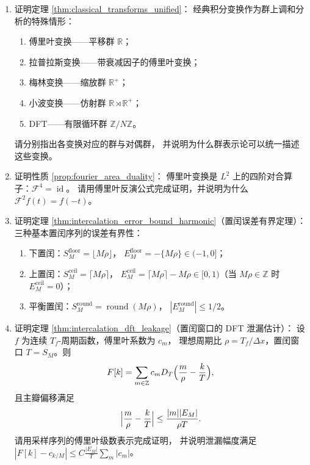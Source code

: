 \begin{enumerate}[leftmargin=3em, label=\textbf{题 \arabic*}]
    \item 证明定理 \ref{thm:classical_transforms_unified}：
    经典积分变换作为群上调和分析的特殊情形：
    \begin{enumerate}[label=(\roman*)]
        \item 傅里叶变换——平移群 $\mathbb{R}$；
        \item 拉普拉斯变换——带衰减因子的傅里叶变换；
        \item 梅林变换——缩放群 $\mathbb{R}^+$；
        \item 小波变换——仿射群 $\mathbb{R}\rtimes\mathbb{R}^+$；
        \item DFT——有限循环群 $\mathbb{Z}/N\mathbb{Z}$。
    \end{enumerate}
    请分别指出各变换对应的群与对偶群，
    并说明为什么群表示论可以统一描述这些变换。

    \item 证明性质 \ref{prop:fourier_area_duality}：
    傅里叶变换是 $L^2$ 上的四阶对合算子：$\mathcal{F}^4=\operatorname{id}$。
    请用傅里叶反演公式完成证明，并说明为什么 $\mathcal{F}^2f(t)=f(-t)$。

    \item 证明定理 \ref{thm:intercalation_error_bound_harmonic}（置闰误差有界定理）：
    三种基本置闰序列的误差有界性：
    \begin{enumerate}[label=(\roman*)]
        \item 下置闰：$S_M^{\mathrm{floor}}=\lfloor M\rho\rfloor$，
              $E_M^{\mathrm{floor}}=-\{M\rho\}\in(-1,0]$；
        \item 上置闰：$S_M^{\mathrm{ceil}}=\lceil M\rho\rceil$，
              $E_M^{\mathrm{ceil}}=\lceil M\rho\rceil-M\rho\in[0,1)$（当 $M\rho\in\mathbb Z$ 时 $E_M^{\mathrm{ceil}}=0$）；
        \item 平衡置闰：$S_M^{\mathrm{round}}=\operatorname{round}(M\rho)$，
              $|E_M^{\mathrm{round}}|\le1/2$。
    \end{enumerate}

    \item 证明定理 \ref{thm:intercalation_dft_leakage}（置闰窗口的 DFT 泄漏估计）：
    设 $f$ 为连续 $T_f$-周期函数，傅里叶系数为 $c_m$，
    理想周期比 $\rho=T_f/\Delta x$，置闰窗口 $T=S_M$。则
    \[
    F[k]=\sum_{m\in\mathbb{Z}}c_mD_T\Bigl(\frac{m}{\rho}-\frac{k}{T}\Bigr),
    \]
    且主瓣偏移满足
    \[
    \Bigl|\frac{m}{\rho}-\frac{k}{T}\Bigr|
    \le\frac{|m||E_M|}{\rho T}.
    \]
    请用采样序列的傅里叶级数表示完成证明，
    并说明泄漏幅度满足 $|F[k]-c_{k/M}|\le C\frac{|E_M|}{T}\sum_m|c_m|$。


\end{enumerate}

